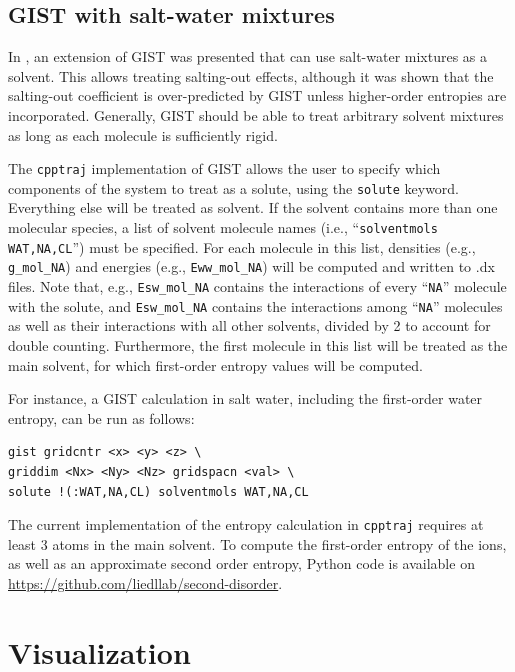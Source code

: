 \documentclass[9pt,tutorial]{livecoms}
\newcommand{\software}{\texttt}
\newcommand\inlinecode{\texttt}
\begin{document}
\subsection{GIST with salt-water mixtures}
In \cite{Waibl2021-gist-salt}, an extension of GIST was presented that can use salt-water mixtures as a solvent.
This allows treating salting-out effects, although it was shown that the salting-out coefficient is over-predicted by GIST unless higher-order entropies are incorporated.
Generally, GIST should be able to treat arbitrary solvent mixtures as long as each molecule is sufficiently rigid.

The \software{cpptraj} implementation of GIST allows the user to specify which components of the system to treat as a solute, using the \inlinecode{solute} keyword.
Everything else will be treated as solvent.
If the solvent contains more than one molecular species, a list of solvent molecule names (i.e., ``\inlinecode{solventmols WAT,NA,CL}'') must be specified.
For each molecule in this list, densities (e.g., \inlinecode{g\_mol\_NA}) and energies (e.g., \inlinecode{Eww\_mol\_NA}) will be computed and written to .dx files.
Note that, e.g., \inlinecode{Esw\_mol\_NA} contains the interactions of every ``\inlinecode{NA}'' molecule with the solute, and \inlinecode{Esw\_mol\_NA} contains the interactions among ``\inlinecode{NA}'' molecules as well as their interactions with all other solvents, divided by 2 to account for double counting.
Furthermore, the first molecule in this list will be treated as the main solvent, for which first-order entropy values will be computed.

For instance, a GIST calculation in salt water, including the first-order water entropy, can be run as follows:

\begin{lstlisting}[style=cpptraj]
gist gridcntr <x> <y> <z> \
griddim <Nx> <Ny> <Nz> gridspacn <val> \
solute !(:WAT,NA,CL) solventmols WAT,NA,CL
\end{lstlisting}

The current implementation of the entropy calculation in \software{cpptraj} requires at least 3 atoms in the main solvent.
To compute the first-order entropy of the ions, as well as an approximate second order entropy, Python code is available on \url{https://github.com/liedllab/second-disorder}.

\section{Visualization}
\end{document}
